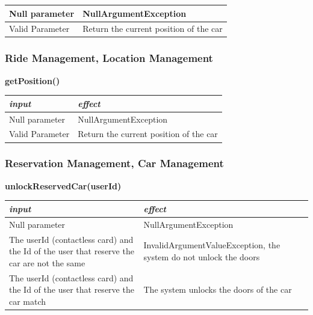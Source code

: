 \documentclass{article}
\begin{document}
\begin{flushleft}
\begin{center}
\begin{tabular}{  |  p{6cm} | p{6cm} |}
    Null parameter & NullArgumentException
     \\ 
  \hline
  Valid Parameter & Return the current position of the car  \\
  \hline

    \end{tabular}
\end{center}
      
      \subsubsection{Ride Management, Location Management} %
             \begin{center}
   \begin {flushleft}
    \textbf{getPosition()}
    \end{flushleft}
        \begin{tabular}{  |  p{6cm} | p{6cm} |}
    \hline
    \textit{input} &  \textit{effect} \\
    \hline
    
    Null parameter & NullArgumentException
     \\ 
  \hline
  Valid Parameter & Return the current position of the car  \\
  \hline

    \end{tabular}
\end{center} 
      
     \newpage 
       \subsubsection{Reservation Management, Car Management} %
       
   \begin{center}    
          \begin {flushleft}
    \textbf{unlockReservedCar(userId)}
    \end{flushleft}
        \begin{tabular}{  |  p{6cm} | p{6cm} |}
    \hline
    \textit{input} &  \textit{effect} \\
    \hline
    
    Null parameter & NullArgumentException 
     \\ 
  \hline
   The userId (contactless card) and the Id of the user that reserve the car are not the same & InvalidArgumentValueException, the system do not unlock the doors \\
  \hline
  The userId (contactless card) and the Id of the user that reserve the car match&  The system unlocks the doors of the car \\
  \hline
    \end{tabular}
\end{center}
       

\end{flushleft}
\end{document}
